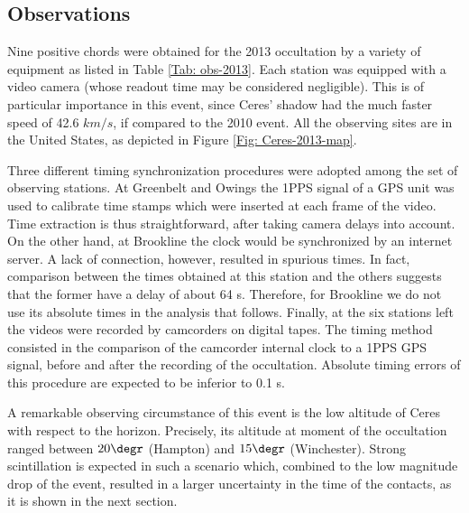 \documentclass[useAMS,usenatbib]{mn2e}
\begin{document}
\subsection{Observations}\label{Sec: observation-2013}

Nine positive chords were obtained for the 2013 occultation by a variety of equipment as listed in Table \ref{Tab: obs-2013}. Each station was equipped with a video camera (whose readout time may be considered negligible). This is of particular importance in this event, since Ceres' shadow had the much faster speed of 42.6 $km/s$, if compared to the 2010 event. All the observing sites are in the United States, as depicted in Figure \ref{Fig: Ceres-2013-map}.

Three different timing synchronization procedures were adopted among the set of observing stations. At Greenbelt and Owings the 1PPS signal of a GPS unit was used to calibrate time stamps which were inserted at each frame of the video. Time extraction is thus straightforward, after taking camera delays into account. On the other hand, at Brookline the clock would be synchronized by an internet server. A lack of connection, however, resulted in spurious times. In fact, comparison between the times obtained at this station and the others suggests that the former have a delay of about 64 s. Therefore, for Brookline we do not use its absolute times in the analysis that follows. Finally, at the six stations left the videos were recorded by camcorders on digital tapes. The timing method consisted in the comparison of the camcorder internal clock to a 1PPS GPS signal, before and after the recording of the occultation. Absolute timing errors of this procedure are expected to be inferior to 0.1 s.

A remarkable observing circumstance of this event is the low altitude of Ceres with respect to the horizon. Precisely, its altitude at moment of the occultation ranged between $20\degr$ (Hampton) and $15\degr$ (Winchester). Strong scintillation is expected in such a scenario which, combined to the low magnitude drop of the event, resulted in a larger uncertainty in the time of the contacts, as it is shown in the next section.
\end{document}
